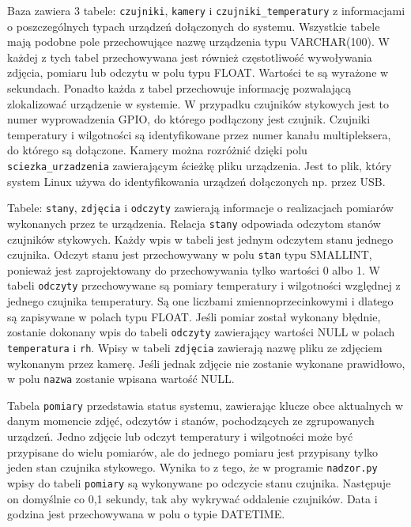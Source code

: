 \documentclass[a4paper,11pt,twoside]{article}
\begin{document}
Baza zawiera 3 tabele: \texttt{czujniki}, \texttt{kamery} i \texttt{czujniki{\_}temperatury} z informacjami o poszczególnych typach urządzeń dołączonych do systemu. Wszystkie tabele mają podobne pole przechowujące nazwę urządzenia typu VARCHAR(100). W każdej z tych tabel przechowywana jest również częstotliwość wywoływania zdjęcia, pomiaru lub odczytu w polu typu FLOAT. Wartości te są wyrażone w sekundach. Ponadto każda z tabel przechowuje informację pozwalającą zlokalizować urządzenie w systemie. W przypadku czujników stykowych jest to numer wyprowadzenia GPIO, do którego podłączony jest czujnik. Czujniki temperatury i wilgotności są identyfikowane przez numer kanału multipleksera, do którego są dołączone. Kamery można rozróżnić dzięki polu \texttt{sciezka{\_}urzadzenia} zawierającym ścieżkę pliku urządzenia. Jest to plik, który system Linux używa do identyfikowania urządzeń dołączonych np. przez USB. 

Tabele: \texttt{stany}, \texttt{zdjęcia} i \texttt{odczyty} zawierają informacje o realizacjach pomiarów wykonanych przez te urządzenia. Relacja \texttt{stany} odpowiada odczytom stanów czujników stykowych. Każdy wpis w tabeli jest jednym odczytem  stanu jednego czujnika. Odczyt stanu jest przechowywany w polu \texttt{stan} typu SMALLINT, ponieważ jest zaprojektowany do przechowywania tylko wartości 0 albo 1. W tabeli \texttt{odczyty} przechowywane są pomiary temperatury i wilgotności względnej z jednego czujnika temperatury. Są one liczbami zmiennoprzecinkowymi i dlatego są zapisywane w polach typu FLOAT. Jeśli pomiar został wykonany błędnie, zostanie dokonany wpis do tabeli \texttt{odczyty} zawierający wartości NULL w polach \texttt{temperatura} i \texttt{rh}. Wpisy w tabeli \texttt{zdjęcia} zawierają nazwę pliku ze zdjęciem wykonanym przez kamerę. Jeśli jednak zdjęcie nie zostanie wykonane prawidłowo, w polu \texttt{nazwa} zostanie wpisana wartość NULL.

Tabela \texttt{pomiary} przedstawia status systemu, zawierając klucze obce aktualnych w danym momencie zdjęć, odczytów i stanów, pochodzących ze zgrupowanych urządzeń. Jedno zdjęcie lub odczyt temperatury i wilgotności może być przypisane do wielu pomiarów, ale do jednego pomiaru jest przypisany tylko jeden stan czujnika stykowego. Wynika to z tego, że w programie \texttt{nadzor.py} wpisy do tabeli \texttt{pomiary} są wykonywane po odczycie stanu czujnika. Następuje on domyślnie co 0,1 sekundy, tak aby wykrywać oddalenie czujników. Data i godzina jest przechowywana w polu o typie DATETIME. 
 
\end{document}
